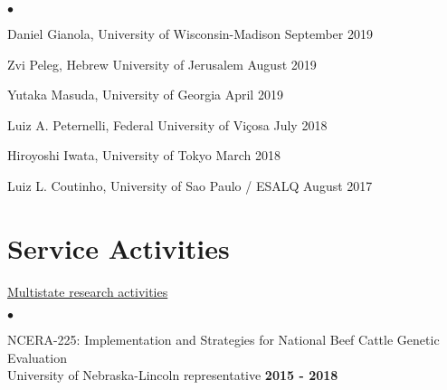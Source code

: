 \documentclass[margin,line,10pt]{res}
\newenvironment{list2}{
  \begin{list}{$\bullet$}{%
      \setlength{\itemsep}{0in}
      \setlength{\parsep}{0in} \setlength{\parskip}{0in}
      \setlength{\topsep}{0in} \setlength{\partopsep}{0in} 
      \setlength{\leftmargin}{0.2in}}}{\end{list}}
\begin{document}
\begin{resume}
\begin{list2}
\item Daniel Gianola, University of Wisconsin-Madison  \hfill September 2019\\

\item Zvi Peleg, Hebrew University of Jerusalem   \hfill August 2019\\

\item Yutaka Masuda, University of Georgia \hfill April 2019\\

\item Luiz A. Peternelli, Federal University of Vi\c cosa  \hfill July 2018\\

\item Hiroyoshi Iwata, University of Tokyo  \hfill March 2018\\
    
\item Luiz L. Coutinho, University of Sao Paulo / ESALQ  \hfill August 2017\\


\end{list2}












\vspace{0.5cm}
\section{\sc Service Activities}



\begin{flushleft}
\hspace{0.3cm} \underline{Multistate research activities}
\end{flushleft}
\begin{list2}


\item NCERA-225: Implementation and Strategies for National Beef Cattle Genetic Evaluation \\ University of Nebraska-Lincoln representative \hfill  \textbf{2015 - 2018}\\
\end{list2}



\end{resume}
\end{document}
